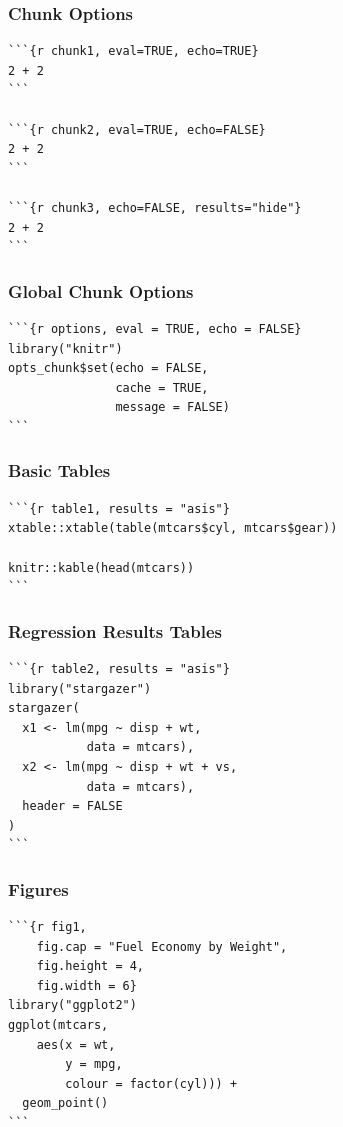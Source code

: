 \documentclass[14pt]{beamer}
\begin{document}
\frame{}



\begin{frame}[fragile]

\frametitle{Chunk Options}

\begin{verbatim}
```{r chunk1, eval=TRUE, echo=TRUE}
2 + 2
```

```{r chunk2, eval=TRUE, echo=FALSE}
2 + 2
```

```{r chunk3, echo=FALSE, results="hide"}
2 + 2
```
\end{verbatim}
\end{frame}


\begin{frame}[fragile]

\frametitle{Global Chunk Options}

\begin{verbatim}
```{r options, eval = TRUE, echo = FALSE}
library("knitr")
opts_chunk$set(echo = FALSE, 
               cache = TRUE, 
               message = FALSE)
```
\end{verbatim}
\end{frame}


\begin{frame}[fragile]
\frametitle{Basic Tables}

\small

\begin{verbatim}
```{r table1, results = "asis"}
xtable::xtable(table(mtcars$cyl, mtcars$gear))

knitr::kable(head(mtcars))
```
\end{verbatim}
\end{frame}


\begin{frame}[fragile]
\frametitle{Regression Results Tables}
\begin{verbatim}
```{r table2, results = "asis"}
library("stargazer")
stargazer(
  x1 <- lm(mpg ~ disp + wt, 
           data = mtcars),
  x2 <- lm(mpg ~ disp + wt + vs, 
           data = mtcars),
  header = FALSE
)
```
\end{verbatim}
\end{frame}


\begin{frame}[fragile]
\frametitle{Figures}	
\begin{verbatim}
```{r fig1, 
    fig.cap = "Fuel Economy by Weight",
    fig.height = 4,
    fig.width = 6}
library("ggplot2")
ggplot(mtcars, 
    aes(x = wt, 
        y = mpg,
        colour = factor(cyl))) + 
  geom_point()
```
\end{verbatim}
\end{frame}
\end{document}
